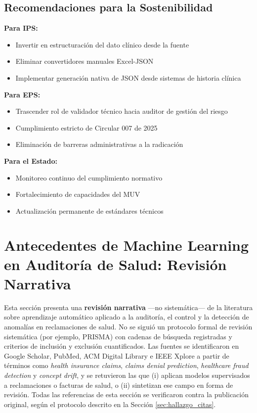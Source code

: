 \documentclass[12pt,letterpaper]{report}
\begin{document}
\subsection{Recomendaciones para la Sostenibilidad}

\begin{tcolorbox}[colback=green!5,colframe=green!50!black,title=Recomendaciones Estratégicas]
\textbf{Para IPS:}
\begin{itemize}
    \item Invertir en estructuración del dato clínico desde la fuente
    \item Eliminar convertidores manuales Excel-JSON
    \item Implementar generación nativa de JSON desde sistemas de historia clínica
\end{itemize}

\textbf{Para EPS:}
\begin{itemize}
    \item Trascender rol de validador técnico hacia auditor de gestión del riesgo
    \item Cumplimiento estricto de Circular 007 de 2025
    \item Eliminación de barreras administrativas a la radicación
\end{itemize}

\textbf{Para el Estado:}
\begin{itemize}
    \item Monitoreo continuo del cumplimiento normativo
    \item Fortalecimiento de capacidades del MUV
    \item Actualización permanente de estándares técnicos
\end{itemize}
\end{tcolorbox}

\section{Antecedentes de Machine Learning en Auditoría de Salud: Revisión Narrativa}
\label{sec:antecedentes_ml}

Esta sección presenta una \textbf{revisión narrativa} —no sistemática— de la literatura sobre aprendizaje automático aplicado a la auditoría, el control y la detección de anomalías en reclamaciones de salud. No se siguió un protocolo formal de revisión sistemática (por ejemplo, PRISMA) con cadenas de búsqueda registradas y criterios de inclusión y exclusión cuantificados. Las fuentes se identificaron en Google Scholar, PubMed, ACM Digital Library e IEEE Xplore a partir de términos como \textit{health insurance claims}, \textit{claims denial prediction}, \textit{healthcare fraud detection} y \textit{concept drift}, y se retuvieron las que (i) aplican modelos supervisados a reclamaciones o facturas de salud, o (ii) sintetizan ese campo en forma de revisión. Todas las referencias de esta sección se verificaron contra la publicación original, según el protocolo descrito en la Sección \ref{sec:hallazgo_citas}.
\end{document}
